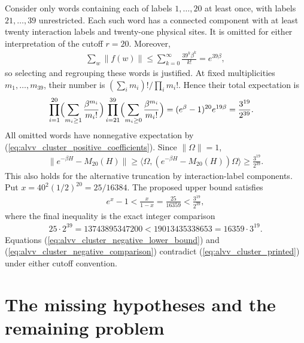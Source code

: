 \documentclass{article}
\begin{document}
Consider only words containing each of labels $1,\ldots,20$ at least once,
with labels $21,\ldots,39$ unrestricted. Each such word has a connected
component with at least twenty interaction labels and twenty-one physical
sites. It is omitted for either interpretation of the cutoff $r=20$.
Moreover,
\begin{align}
    \sum_w\|f(w)\|
    \le\sum_{k=0}^{\infty}\frac{39^k\beta^k}{k!}=e^{39\beta},
    \label{eq:alvv_cluster_absolute_convergence}
\end{align}
so selecting and regrouping these words is justified. At fixed
multiplicities $m_1,\ldots,m_{39}$, their number is
$(\sum_i m_i)!/\prod_i m_i!$. Hence their total expectation is
\begin{align}
    \prod_{i=1}^{20}\Bigl(\sum_{m_i\ge1}\frac{\beta^{m_i}}{m_i!}\Bigr)
    \prod_{i=21}^{39}\Bigl(\sum_{m_i\ge0}\frac{\beta^{m_i}}{m_i!}\Bigr)
     & =(e^\beta-1)^{20}e^{19\beta}
    =\frac{3^{19}}{2^{39}}.
    \label{eq:alvv_cluster_selected_weight}
\end{align}
All omitted words have nonnegative expectation by
(\ref{eq:alvv_cluster_positive_coefficients}). Since $\|\Omega\|=1$,
\begin{align}
    \|e^{-\beta H}-M_{20}(H)\|
    \ge\langle\Omega,(e^{-\beta H}-M_{20}(H))\Omega\rangle
    \ge\frac{3^{19}}{2^{39}}.
    \label{eq:alvv_cluster_negative_lower_bound}
\end{align}
This also holds for the alternative truncation by interaction-label
components. Put $x=40^2(1/2)^{20}=25/16384$. The proposed upper bound satisfies
\begin{align}
    e^x-1<\frac{x}{1-x}=\frac{25}{16359}<\frac{3^{19}}{2^{39}},
    \label{eq:alvv_cluster_negative_comparison}
\end{align}
where the final inequality is the exact integer comparison
\begin{align}
    25\cdot2^{39}=13743895347200
    <19013435338653=16359\cdot3^{19}.
    \label{eq:alvv_cluster_integer_comparison}
\end{align}
Equations (\ref{eq:alvv_cluster_negative_lower_bound}) and
(\ref{eq:alvv_cluster_negative_comparison}) contradict
(\ref{eq:alvv_cluster_printed}) under either cutoff convention.

\newpage
\section{The missing hypotheses and the remaining problem}
\end{document}
